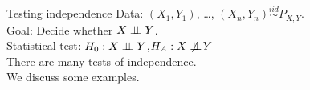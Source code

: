 \documentclass[11pt,handout,aspectratio=169,dvipsnames]{beamer}
\begin{document}



\begin{frame}{Testing independence}
Data: $(X_1,Y_1)$, \ldots, $(X_n,Y_n)\overset{iid}{\sim}P_{X,Y}$.\\[.3cm]
Goal: Decide whether $X\perp\!\!\! \perp Y$.\\[.3cm]
Statistical test: \qquad $H_0:X\perp\!\!\! \perp Y$,\quad $H_A:X\indep\!\!\!\!\!\!\not\;\;\; Y$\\[.7cm]
There are many tests of independence.\\[.3cm]
We discuss some examples.
\end{frame}
\end{document}

